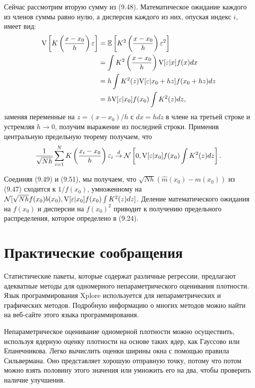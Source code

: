 Сейчас рассмотрим вторую сумму из (9.48). Математическое ожидание каждого из членов суммы равно нулю, а дисперсия каждого из них, опуская индекс $i$, имеет вид:
\begin{equation}
\begin{split}
\mathrm{V} \left[ K \left( \frac{x - x_0}{h} \right)\varepsilon \right] &= \mathbb{E} \left[ K^2 \left( \frac{x - x_0}{h} \right)\varepsilon^2 \right] \\
 &= \int K^2 \left( \frac{x - x_0}{h} \right) \mathrm{V}[\varepsilon|x]f(x)dx \\
 &= h \int K^2(z)\mathrm{V}[\varepsilon|x_0 + hz]f(x_0 + hz)dz \\
 &= h\mathrm{V}[\varepsilon|x_0]f(x_0) \int K^2(z)dz,
\end{split}
\end{equation}
заменяя переменные на $z = (x - x_0)/h$ с $dx = hdz$ в члене на третьей строке и устремляя $h \rightarrow 0$, получим выражение из последней строки. Применив центральную предельную теорему получаем, что 
\begin{equation}
\frac{1}{\sqrt{Nh}} \sum_{i=1}^N K \left( \frac{x_i - x_0}{h} \right)\varepsilon_i \stackrel{d}{\rightarrow} \mathcal{N} \left[ 0, \mathrm{V}[\varepsilon|x_0]f(x_0) \int K^2(z)dz \right].
\end{equation}

Соединяя (9.49) и (9.51), мы получаем, что $\sqrt{Nh}(\hat{m}(x_0) - m(x_0))$ из (9.47) сходится к $1/f(x_0)$, умноженному на $\mathcal{N}[\sqrt{Nh}f(x_0)b(x_0),\mathrm{V}[\varepsilon|x_0]f(x_0) \int K^2(z)dz]$. Деление математического ожидания на $f(x_0)$ и дисперсии на $f(x_0)^2$ приводит к получению предельного распределения, которое определено в (9.24).

\section{Практические сообращения}

Статистические пакеты, которые содержат различные регрессии, предлагают адекватные методы для одномерного непараметрического оценивания плотности. Язык программирования Xplore используется для непараметрических и графических методов. Подробную информацию о многих методов можно найти на веб-сайте этого языка программирования.

Непараметрическое оценивание одномерной плотности можно осуществить, используя ядерную оценку плотности на основе таких ядер, как Гауссово или Епанечникова. Легко вычислить оценки ширины окна с помощью правила Сильвермана. Оно представляет хорошую отправную точку, потому что потом можно взять половину этого значения или умножить его на два, чтобы проверить наличие улучшения.

